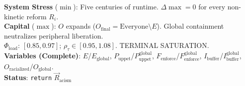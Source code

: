\documentclass[12pt,openany]{book}
\begin{document}
\begin{tcolorbox}[colback=black!5, colframe=black!70, fonttitle=\bfseries\ttfamily, title=12. RUNTIME LOG: FINAL OUTPUT \normalfont\small--- Chapters 11--12]
\ttfamily\small
\textbf{System Stress} ($\min$): Five centuries of runtime. $\Delta\max = 0$ for every non-kinetic reform $R_i$.\\
\textbf{Capital} ($\max$): $O$ expands ($O_{\text{final}} = \text{Everyone} \setminus E$). Global containment neutralizes peripheral liberation.\\
\textbf{$\Phi_{\text{load}}$}: $[0.85, 0.97]$; $\rho_{\tau} \in [0.95, 1.08]$. TERMINAL SATURATION.\\
\textbf{Variables (Complete)}: $E$/$E_{\text{global}}$, $P_{\text{uppet}}$/$P_{\text{uppet}}^{\text{global}}$, $F_{\text{enforce}}$/$F_{\text{enforce}}^{\text{global}}$, $I_{\text{buffer}}$/$I_{\text{buffer}}^{\text{global}}$, $O_{\text{racialized}}$/$O_{\text{global}}$.\\
\textbf{Status}: \texttt{return} $\vec{R}_{\text{acism}}$
\end{tcolorbox}

\backmatter
\end{document}
